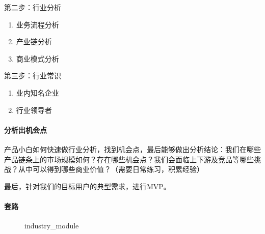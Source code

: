 \documentclass[letterpaper,11pt,english]{sphinxmanual}
\begin{document}
第二步：行业分析
\begin{enumerate}
%
\item {} 
业务流程分析

\item {} 
产业链分析

\item {} 
商业模式分析

\end{enumerate}

第三步：行业常识
\begin{enumerate}
%
\item {} 
业内知名企业

\item {} 
行业领导者

\end{enumerate}


\paragraph{分析出机会点}
\label{\detokenize{chapter_knowledge/industry_analysis:id4}}
产品小白如何快速做行业分析，找到机会点，最后能够做出分析结论：我们在哪些产品链条上的市场规模如何？存在哪些机会点？我们会面临上下游及竞品等哪些挑战？从中可以得到哪些商业价值？（需要日常练习，积累经验）

最后，针对我们的目标用户的典型需求，进行MVP。


\paragraph{套路}
\label{\detokenize{chapter_knowledge/industry_analysis:id5}}
\begin{figure}[H]
\centering
\capstart

\noindent{}
\caption{industry\_module}\label{\detokenize{chapter_knowledge/industry_analysis:id27}}\end{figure}
\end{document}
